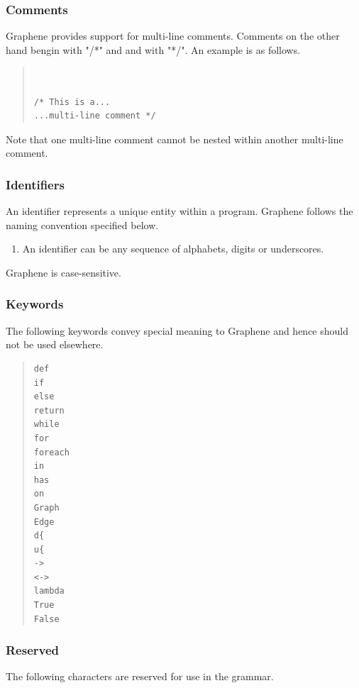 \documentclass[a4paper]{article}
\begin{document}
\subsubsection{Comments}

Graphene provides support for multi-line comments. Comments on the other hand bengin with "/*" and and with "*/". An example is as follows.

\begin{quote}
\begin{verbatim}


/* This is a...
...multi-line comment */ 

\end{verbatim}
\end{quote}
Note that one multi-line comment cannot be nested within another multi-line comment.

\subsubsection{Identifiers}

\noindent An identifier represents a unique entity within a program. Graphene follows the naming convention specified below.

\begin{enumerate}
\item An identifier can be any sequence of alphabets, digits or underscores.
\end{enumerate}

\noindent Graphene is case-sensitive.

\subsubsection{Keywords}
The following keywords convey special meaning to Graphene and hence should not be used elsewhere.

\begin{multicols}{2}
\begin{quote}
\begin{verbatim}
def
if
else
return
while
for
foreach
in
has
on
Graph
Edge
d{
u{
->
<->
lambda
True
False
\end{verbatim}
\end{quote}
\end{multicols}

\subsubsection{Reserved}
The following characters are reserved for use in the grammar.
\end{document}
